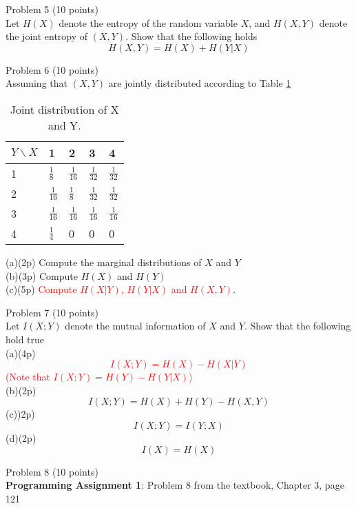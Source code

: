 \documentclass[12pt]{article}
\begin{document}
\vspace{4mm}

Problem 5  (10 points)\\
 Let $H(X)$ denote the entropy of the random variable $X$, and  $H(X,Y)$ denote the joint entropy of $(X,Y)$. Show that the following holds
	$$ H(X,Y) = H(X) + H(Y|X) $$

\vspace{4mm}

Problem 6  (10 points)\\
 Assuming that $(X,Y)$ are jointly distributed according to Table \ref{tab:table_joint}

\begin{table}[h!]
\begin{minipage}[b]{0.99\linewidth}
\centering
\begin{tabular}{ |l|l|l|l|l| }
\hline
$ Y \backslash X$ & 1 & 2& 3 & 4 \\ 
  \hline
1  & $\frac{1}{8}$  &  $\frac{1}{16}$  &  $\frac{1}{32}$  & $\frac{1}{32} $ \\  
2  & $\frac{1}{16}$  &  $\frac{1}{8}$  &  $\frac{1}{32}$  & $\frac{1}{32}$  \\      
3  &$\frac{1}{16} $ & $\frac{1}{16}$ & $\frac{1}{16}$ & $\frac{1}{16} $ \\  
4  & $\frac{1}{4}$  &  0 &  0 & 0 \\ 
\hline
\end{tabular}
\caption{Joint distribution of X and Y.}
\label{tab:table_joint}
\end{minipage}
\end{table}
(a)(2p) Compute the marginal distributions of $X$ and $Y$\\
(b)(3p) Compute $H(X)$ and $H(Y)$\\
(c)(5p) \textcolor{red}{Compute $H(X|Y)$, $H(Y|X)$ and $H(X,Y)$}.

\vspace{4mm}
Problem 7  (10 points)\\
Let $I(X;Y)$ denote the mutual information of $X$ and $Y$. Show that the following hold true \\
(a)(4p)  \textcolor{red}{$$I(X;Y) = H(X) - H(X | Y)$$
(Note that $I(X;Y) = H(Y) - H(Y | X)$)} \\
(b)(2p)  $$I(X;Y) = H(X) + H(Y) - H(X,Y)$$
(c))2p)  $$I(X;Y) = I(Y;X)$$
(d)(2p)  $$I(X) = H(X)$$

Problem 8  (10 points)\\
\textbf{Programming Assignment 1}: Problem 8 from the textbook, Chapter 3, page 121
\end{document}
